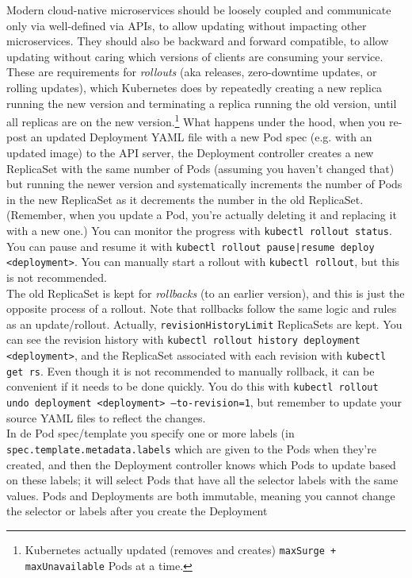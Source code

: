 \documentclass[table, xcdraw]{article}%
\begin{document}
Modern cloud-native microservices should be loosely coupled and communicate only via well-defined via APIs, to allow updating without impacting other microservices. They should also be backward and forward compatible, to allow updating without caring which versions of clients are consuming your service. These are requirements for \emph{rollouts} (aka releases, zero-downtime updates, or rolling updates), which Kubernetes does by repeatedly creating a new replica running the new version and terminating a replica running the old version, until all replicas are on the new version.\footnote{Kubernetes actually updated (removes and creates) \texttt{maxSurge + maxUnavailable} Pods at a time.} What happens under the hood, when you re-post an updated Deployment YAML file with a new Pod spec (e.g. with an updated image) to the API server, the Deployment controller creates a new ReplicaSet with the same number of Pods (assuming you haven't changed that) but running the newer version and systematically increments the number of Pods in the new ReplicaSet as it decrements the number in the old ReplicaSet. (Remember, when you update a Pod, you’re actually deleting it and replacing it with a new one.) You can monitor the progress with \texttt{kubectl rollout status}. You can pause and resume it with \texttt{kubectl rollout pause|resume deploy <deployment>}. You can manually start a rollout with \texttt{kubectl rollout}, but this is not recommended.\\
The old ReplicaSet is kept for \emph{rollbacks} (to an earlier version), and this is just the opposite process of a rollout. Note that rollbacks follow the same logic and rules as an update/rollout. Actually, \texttt{revisionHistoryLimit} ReplicaSets are kept. You can see the revision history with \texttt{kubectl rollout history deployment <deployment>}, and the ReplicaSet associated with each revision with \texttt{kubectl get rs}. Even though it is not recommended to manually rollback, it can be convenient if it needs to be done quickly. You do this with \texttt{kubectl rollout undo deployment <deployment> --to-revision=1}, but remember to update your source YAML files to reflect the changes.\\
In de Pod spec/template you specify one or more labels (in \texttt{spec.template.metadata.labels} which are given to the Pods when they're created, and then the Deployment controller knows which Pods to update based on these labels; it will select Pods that have all the selector labels with the same values. Pods and Deployments are both immutable, meaning you cannot change the selector or labels after you create the Deployment
\end{document}
